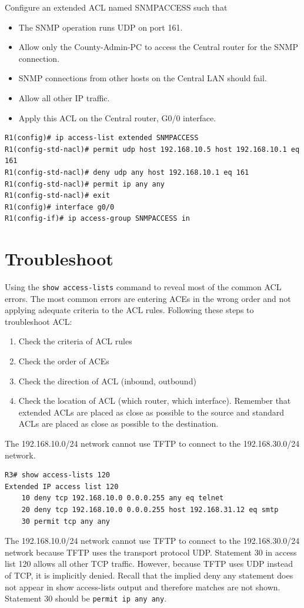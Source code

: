 \begin{example}
Configure an extended ACL named SNMPACCESS such that 
\begin{itemize}
\item The SNMP operation runs UDP on port 161.
\item Allow only the County-Admin-PC to access the Central router for the SNMP connection.
\item SNMP connections from other hosts on the Central LAN should fail.
\item Allow all other IP traffic.
\item Apply this ACL on the Central router, G0/0 interface.
\end{itemize}
\begin{verbatim}
R1(config)# ip access-list extended SNMPACCESS
R1(config-std-nacl)# permit udp host 192.168.10.5 host 192.168.10.1 eq 161
R1(config-std-nacl)# deny udp any host 192.168.10.1 eq 161
R1(config-std-nacl)# permit ip any any
R1(config-std-nacl)# exit
R1(config)# interface g0/0
R1(config-if)# ip access-group SNMPACCESS in
\end{verbatim}
\end{example}

\section{Troubleshoot}

Using the \texttt{show access-lists} command to reveal most of the common ACL errors. The most common errors are entering ACEs in the wrong order and not applying adequate criteria to the ACL rules. Following these steps to troubleshoot ACL:

\begin{enumerate}
\item Check the criteria of ACL rules
\item Check the order of ACEs
\item Check the direction of ACL (inbound, outbound)
\item Check the location of ACL (which router, which interface). Remember that extended ACLs are placed as close as possible to the source and standard ACLs are placed as close as possible to the destination.
\end{enumerate}

\begin{example}
The 192.168.10.0/24 network cannot use TFTP to connect to the 192.168.30.0/24 network.
\begin{verbatim}
R3# show access-lists 120
Extended IP access list 120
    10 deny tcp 192.168.10.0 0.0.0.255 any eq telnet
    20 deny tcp 192.168.10.0 0.0.0.255 host 192.168.31.12 eq smtp
    30 permit tcp any any
\end{verbatim}
The 192.168.10.0/24 network cannot use TFTP to connect to the 192.168.30.0/24 network because TFTP uses the transport protocol UDP. Statement 30 in access list 120 allows all other TCP traffic. However, because TFTP uses UDP instead of TCP, it is implicitly denied. Recall that the implied deny any statement does not appear in show access-lists output and therefore matches are not shown. Statement 30 should be \texttt{permit ip any any}.
\end{example}


